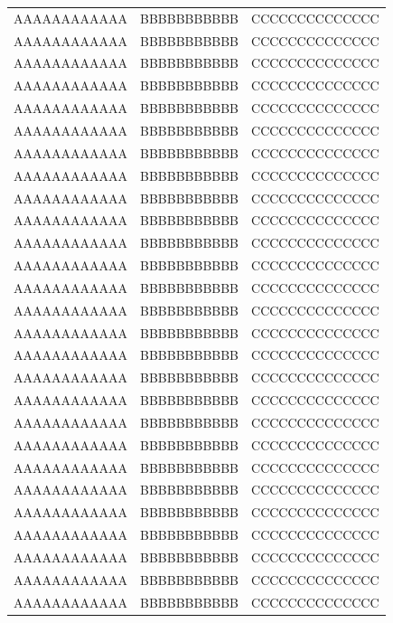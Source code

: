 \begin{longtable}[h]{ccc}
  AAAAAAAAAAAA   &   BBBBBBBBBBB   &   CCCCCCCCCCCCCC   \\
  AAAAAAAAAAAA   &   BBBBBBBBBBB   &   CCCCCCCCCCCCCC   \\
  AAAAAAAAAAAA   &   BBBBBBBBBBB   &   CCCCCCCCCCCCCC   \\
  AAAAAAAAAAAA   &   BBBBBBBBBBB   &   CCCCCCCCCCCCCC   \\
  AAAAAAAAAAAA   &   BBBBBBBBBBB   &   CCCCCCCCCCCCCC   \\
  AAAAAAAAAAAA   &   BBBBBBBBBBB   &   CCCCCCCCCCCCCC   \\
  AAAAAAAAAAAA   &   BBBBBBBBBBB   &   CCCCCCCCCCCCCC   \\
  AAAAAAAAAAAA   &   BBBBBBBBBBB   &   CCCCCCCCCCCCCC   \\
  AAAAAAAAAAAA   &   BBBBBBBBBBB   &   CCCCCCCCCCCCCC   \\
  AAAAAAAAAAAA   &   BBBBBBBBBBB   &   CCCCCCCCCCCCCC   \\
  AAAAAAAAAAAA   &   BBBBBBBBBBB   &   CCCCCCCCCCCCCC   \\
  AAAAAAAAAAAA   &   BBBBBBBBBBB   &   CCCCCCCCCCCCCC   \\
  AAAAAAAAAAAA   &   BBBBBBBBBBB   &   CCCCCCCCCCCCCC   \\
  AAAAAAAAAAAA   &   BBBBBBBBBBB   &   CCCCCCCCCCCCCC   \\
  AAAAAAAAAAAA   &   BBBBBBBBBBB   &   CCCCCCCCCCCCCC   \\
  AAAAAAAAAAAA   &   BBBBBBBBBBB   &   CCCCCCCCCCCCCC   \\
  AAAAAAAAAAAA   &   BBBBBBBBBBB   &   CCCCCCCCCCCCCC   \\
  AAAAAAAAAAAA   &   BBBBBBBBBBB   &   CCCCCCCCCCCCCC   \\
  AAAAAAAAAAAA   &   BBBBBBBBBBB   &   CCCCCCCCCCCCCC   \\
  AAAAAAAAAAAA   &   BBBBBBBBBBB   &   CCCCCCCCCCCCCC   \\
  AAAAAAAAAAAA   &   BBBBBBBBBBB   &   CCCCCCCCCCCCCC   \\
  AAAAAAAAAAAA   &   BBBBBBBBBBB   &   CCCCCCCCCCCCCC   \\
  AAAAAAAAAAAA   &   BBBBBBBBBBB   &   CCCCCCCCCCCCCC   \\
  AAAAAAAAAAAA   &   BBBBBBBBBBB   &   CCCCCCCCCCCCCC   \\
  AAAAAAAAAAAA   &   BBBBBBBBBBB   &   CCCCCCCCCCCCCC   \\
  AAAAAAAAAAAA   &   BBBBBBBBBBB   &   CCCCCCCCCCCCCC   \\
  AAAAAAAAAAAA   &   BBBBBBBBBBB   &   CCCCCCCCCCCCCC   \\

\end{longtable}

